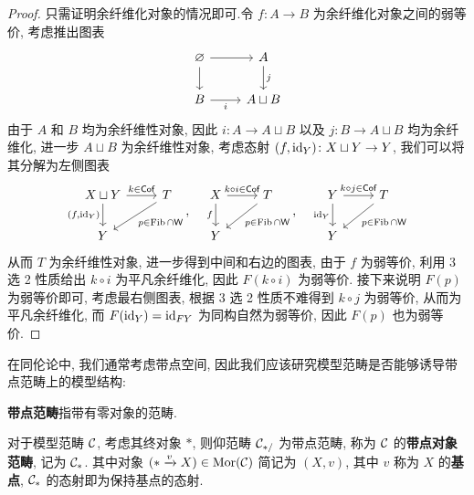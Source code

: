 \begin{proof}
    只需证明余纤维化对象的情况即可.令 $f\colon A \to B$ 为余纤维化对象之间的弱等价, 考虑推出图表
    \[\begin{tikzcd}
	\varnothing & A \\
	B & {A\sqcup B}
	\arrow[from=1-1, to=1-2]
	\arrow[from=1-1, to=2-1]
	\arrow["j", from=1-2, to=2-2]
	\arrow["i"', from=2-1, to=2-2]
    \end{tikzcd}\]
    由于 $A$ 和 $B$ 均为余纤维性对象, 因此 $i \colon A\to A \sqcup B$ 以及 $j\colon B \to A \sqcup B$ 均为余纤维化, 进一步 $A\sqcup B$ 为余纤维性对象, 考虑态射 $(f,\mathrm{id}_Y)\colon  X \sqcup Y \to Y$, 我们可以将其分解为左侧图表
    \[\begin{tikzcd}
	{X\sqcup Y} & T \\
	Y
	\arrow["{k\in \Cof}", from=1-1, to=1-2]
	\arrow["{(f,\identity_Y)}"', from=1-1, to=2-1]
	\arrow["{p\in \Fib \cap \cate{W}}", from=1-2, to=2-1]
    \end{tikzcd}, \quad \begin{tikzcd}
	X & T \\
	Y
	\arrow["{k\circ i\in \Cof}", from=1-1, to=1-2]
	\arrow["f"', from=1-1, to=2-1]
	\arrow["{p\in \Fib \cap \cate{W}}", from=1-2, to=2-1]
    \end{tikzcd}, \quad \begin{tikzcd}
	Y & T \\
	Y
	\arrow["{k\circ j\in \Cof}", from=1-1, to=1-2]
	\arrow["{\identity_Y}"', from=1-1, to=2-1]
	\arrow["{p\in \Fib \cap \cate{W}}", from=1-2, to=2-1]
\end{tikzcd}\] 
    从而 $T$ 为余纤维性对象, 进一步得到中间和右边的图表, 由于 $f$ 为弱等价, 利用 3 选 2 性质给出 $k\circ i$ 为平凡余纤维化, 因此 $F(k\circ i)$ 为弱等价. 接下来说明 $F(p)$ 为弱等价即可, 考虑最右侧图表, 根据 3 选 2 性质不难得到 $k \circ j$ 为弱等价, 从而为平凡余纤维化, 而 $F(\mathrm{id}_Y) = \mathrm{id}_{FY}$ 为同构自然为弱等价, 因此 $F(p)$ 也为弱等价.
\end{proof} 
在同伦论中, 我们通常考虑带点空间, 因此我们应该研究模型范畴是否能够诱导带点范畴上的模型结构:
\begin{definition}[带点范畴]
    \textbf{带点范畴}指带有零对象的范畴.
\end{definition}
对于模型范畴 $\cal{C}$, 考虑其终对象 $*$, 则仰范畴 $\cal{C}_{*/}$ 为带点范畴, 称为 $\cal{C}$ 的\textbf{带点对象范畴}, 记为 $\cal{C}_{*}$. 其中对象 $(*\xrightarrow{v}X)\in \operatorname{Mor}(\cal{C})$ 简记为 $(X,v)$, 其中 $v$ 称为 $X$ 的\textbf{基点}, $\cal{C}_{*}$ 的态射即为保持基点的态射.\\
